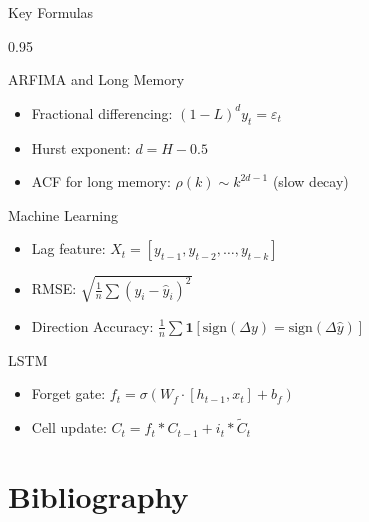\documentclass[9pt, aspectratio=169, t]{beamer}
\begin{document}
\begin{frame}[shrink=5]{Key Formulas}
    \begin{cminipage}{0.95\textwidth}
    \vspace{-0.8cm}
    \begin{block}{ARFIMA and Long Memory}
        \begin{itemize}\setlength{\itemsep}{0pt}
            \item Fractional differencing: $(1-L)^d y_t = \varepsilon_t$
            \item Hurst exponent: $d = H - 0.5$
            \item ACF for long memory: $\rho(k) \sim k^{2d-1}$ (slow decay)
        \end{itemize}
    \end{block}

    \begin{block}{Machine Learning}
        \begin{itemize}\setlength{\itemsep}{0pt}
            \item Lag feature: $X_t = [y_{t-1}, y_{t-2}, \ldots, y_{t-k}]$
            \item RMSE: $\sqrt{\frac{1}{n}\sum(y_i - \hat{y}_i)^2}$
            \item Direction Accuracy: $\frac{1}{n}\sum \mathbf{1}[\text{sign}(\Delta y) = \text{sign}(\Delta \hat{y})]$
        \end{itemize}
    \end{block}

    \begin{block}{LSTM}
        \begin{itemize}\setlength{\itemsep}{0pt}
            \item Forget gate: $f_t = \sigma(W_f \cdot [h_{t-1}, x_t] + b_f)$
            \item Cell update: $C_t = f_t * C_{t-1} + i_t * \tilde{C}_t$
        \end{itemize}
    \end{block}
    \end{cminipage}
\end{frame}

\section{Bibliography}
\end{document}
